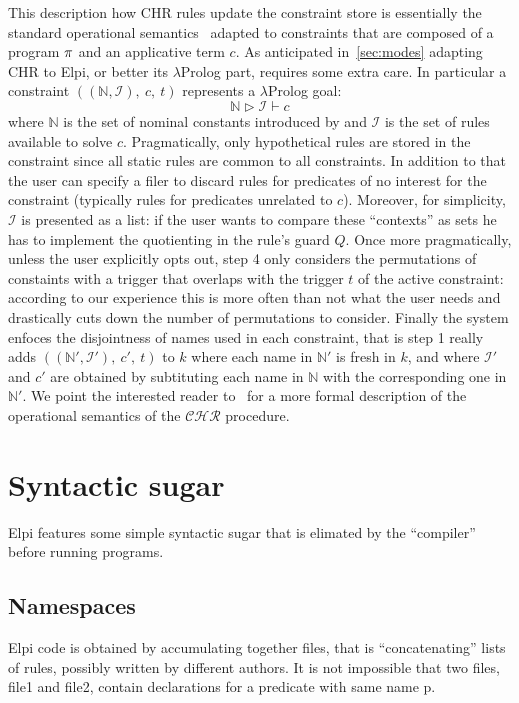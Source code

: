 \documentclass[a4paper, 11pt]{book}
\begin{document}
This description how CHR rules update the constraint store is
essentially the standard operational semantics~\cite{10.1007/978-3-540-27775-0_7}
adapted to constraints that are composed of a program ${\pi}$ and
an applicative term $c$. As anticipated in~\ref{sec:modes} adapting CHR to Elpi, or
better its $\lambda$Prolog part, requires some extra care. In particular
a constraint $((\mathbb{N},\mathcal{I}),\ c,\ t)$ represents a $\lambda$Prolog goal:
$$
\mathbb{N} \triangleright  \mathcal{I} \vdash c
$$
\noindent
where $\mathbb{N}$ is the set of nominal constants introduced by 
and $\mathcal{I}$ is the set of rules available to solve $c$.
Pragmatically, only hypothetical rules are stored in the constraint since all
static rules are common to all constraints. In addition to that the
user can specify a filer to discard rules for predicates of no interest for
the constraint (typically rules for predicates unrelated to $c$).
Moreover, for simplicity, $\mathcal{I}$ is presented as a list: if the
user wants to compare these ``contexts'' as sets he has to implement the
quotienting in the rule's guard $Q$. Once more pragmatically, unless
the user explicitly opts out, step 4 only considers the permutations of
constaints with a trigger that overlaps with the trigger $t$ of the active
constraint: according to our experience this is more often than not what
the user needs and drastically cuts down the number of permutations to consider.
Finally the system enfoces the disjointness of names used in each constraint, that
is step 1 really adds $((\mathbb{N'},\mathcal{I'}),\ c',\ t)$ to $k$
where each name in $\mathbb{N'}$ is fresh in $k$, and where
$\mathcal{I'}$ and $c'$ are obtained by subtituting each name in
$\mathbb{N}$ with the corresponding one in $\mathbb{N}'$.
We point the interested
reader to~\cite{TASSI_2019} for a more formal description of the
operational semantics of the $\mathcal{CHR}$ procedure.

\section{Syntactic sugar}

Elpi features some simple syntactic sugar that is elimated by
the ``compiler'' before running programs.

\subsection{Namespaces}

Elpi code is obtained by accumulating together files, that is
``concatenating'' lists of rules, possibly written by different
authors. It is not impossible that
two files, file1 and file2, contain declarations for a predicate with same name p.
\end{document}
